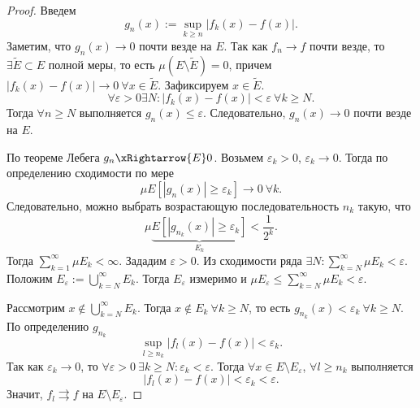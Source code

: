\documentclass[12pt,a4paper]{report}
\begin{document}

\begin{proof}
    Введем
    \[
    g_n(x):=\sup_{k\geq n}|f_k(x)-f(x)|.
    \]
    Заметим, что $g_n(x)\to0$ почти везде на $E$. Так как $f_n\to f$ почти везде, то $\exists \widetilde E\subset E$ полной меры, то есть $\mu(E\setminus\widetilde E)=0$, причем $|f_k(x)-f(x)|\to0 \ \forall x\in\widetilde E$. Зафиксируем $x\in\widetilde E$.
    \[
    \forall \varepsilon>0 \exists N \colon |f_k(x)-f(x)|<\varepsilon \ \forall k\geq N.
    \]
    Тогда $\forall n\geq N$ выполняется $g_n(x)\leq\varepsilon$. Следовательно, $g_n(x)\to0$ почти везде на $E$.

    По теореме Лебега $g_n\xRightarrow{E}0$. Возьмем $\varepsilon_k>0$, $\varepsilon_k\to0$. Тогда по определению сходимости по мере
    \[
    \mu E[|g_n(x)|\geq\varepsilon_k]\to0 \ \forall k.
    \]
    Следовательно, можно выбрать возрастающую последовательность $n_k$ такую, что
    \[
    \mu\underbrace{E[|g_{n_k}(x)|\geq\varepsilon_k]}_{E_k}<\frac{1}{2^k}.
    \]
    Тогда $\sum_{k=1}^{\infty}\mu E_k<\infty$. Зададим $\varepsilon>0$. Из сходимости ряда $\exists N\colon \sum_{k=N}^{\infty}\mu E_k<\varepsilon$. Положим $E_\varepsilon:=\bigcup_{k=N}^{\infty}E_k$. Тогда $E_\varepsilon$ измеримо и $\mu E_\varepsilon\leq\sum_{k=N}^{\infty}\mu E_k<\varepsilon$.

    Рассмотрим $x\notin \bigcup_{k=N}^{\infty}E_k$. Тогда $x\notin E_k\ \forall k\geq N$, то есть $g_{n_k}(x)<\varepsilon_k\ \forall k\geq N$. По определению $g_{n_k}$
    \[
    \sup_{l\geq n_k}|f_l(x)-f(x)|<\varepsilon_k.
    \]
    Так как $\varepsilon_k\to0$, то $\forall \varepsilon>0\ \exists k\geq N\colon \varepsilon_k<\varepsilon$. Тогда $\forall x\in E\setminus E_\varepsilon$, $\forall l\geq n_k$ выполняется
    \[
    |f_l(x)-f(x)|<\varepsilon_k<\varepsilon.
    \]
    Значит, $f_l\rightrightarrows f$ на $E\setminus E_\varepsilon$.
\end{proof}

\end{document}
